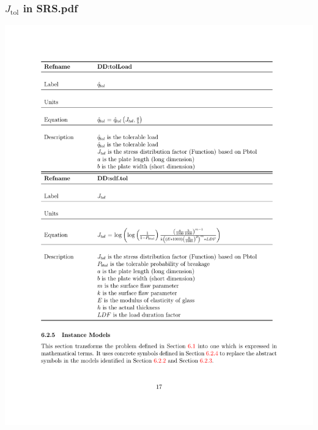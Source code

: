 \documentclass{beamer}
\begin{document}
\begin{frame}

\frametitle{$J_{\mbox{tol}}$ in SRS.pdf}
\begin{center}
\includegraphics[width=1.0\textwidth]{Jtol_pdf.pdf}
\end{center}
\end{frame}

\end{document}
